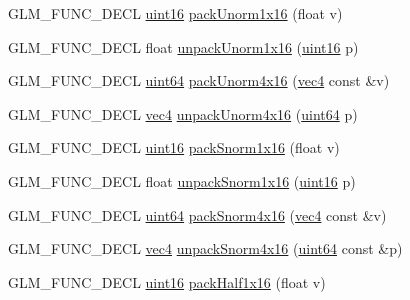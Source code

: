 \begin{DoxyCompactItemize}
\item 
G\+L\+M\+\_\+\+F\+U\+N\+C\+\_\+\+D\+E\+CL \hyperlink{group__gtc__type__precision_gad8c2939e1fdd8e5828b31d95c52255d5}{uint16} \hyperlink{group__gtc__packing_ga60c7d915f5653559ae02c2f79a8c5c1d}{pack\+Unorm1x16} (float v)
\item 
G\+L\+M\+\_\+\+F\+U\+N\+C\+\_\+\+D\+E\+CL float \hyperlink{group__gtc__packing_ga7770e3ade4f4764cc1b2eb42ac4ec188}{unpack\+Unorm1x16} (\hyperlink{group__gtc__type__precision_gad8c2939e1fdd8e5828b31d95c52255d5}{uint16} p)
\item 
G\+L\+M\+\_\+\+F\+U\+N\+C\+\_\+\+D\+E\+CL \hyperlink{group__gtc__type__precision_gae3632bf9b37da66233d78930dd06378a}{uint64} \hyperlink{group__gtc__packing_gac561f06c908b7302537a8ef29fcb409e}{pack\+Unorm4x16} (\hyperlink{group__core__types_ga5881b1b022d7fd1b7218f5916532dd02}{vec4} const \&v)
\item 
G\+L\+M\+\_\+\+F\+U\+N\+C\+\_\+\+D\+E\+CL \hyperlink{group__core__types_ga5881b1b022d7fd1b7218f5916532dd02}{vec4} \hyperlink{group__gtc__packing_gafb2b502bc406031a5618ce930139a9e3}{unpack\+Unorm4x16} (\hyperlink{group__gtc__type__precision_gae3632bf9b37da66233d78930dd06378a}{uint64} p)
\item 
G\+L\+M\+\_\+\+F\+U\+N\+C\+\_\+\+D\+E\+CL \hyperlink{group__gtc__type__precision_gad8c2939e1fdd8e5828b31d95c52255d5}{uint16} \hyperlink{group__gtc__packing_gac29411d6c0f6ed0fe9f0396dfe92e0e8}{pack\+Snorm1x16} (float v)
\item 
G\+L\+M\+\_\+\+F\+U\+N\+C\+\_\+\+D\+E\+CL float \hyperlink{group__gtc__packing_ga246f451cebf590726324f7a283e3d65e}{unpack\+Snorm1x16} (\hyperlink{group__gtc__type__precision_gad8c2939e1fdd8e5828b31d95c52255d5}{uint16} p)
\item 
G\+L\+M\+\_\+\+F\+U\+N\+C\+\_\+\+D\+E\+CL \hyperlink{group__gtc__type__precision_gae3632bf9b37da66233d78930dd06378a}{uint64} \hyperlink{group__gtc__packing_ga9b237d7c66b7a71964e6d1f4dc06539f}{pack\+Snorm4x16} (\hyperlink{group__core__types_ga5881b1b022d7fd1b7218f5916532dd02}{vec4} const \&v)
\item 
G\+L\+M\+\_\+\+F\+U\+N\+C\+\_\+\+D\+E\+CL \hyperlink{group__core__types_ga5881b1b022d7fd1b7218f5916532dd02}{vec4} \hyperlink{group__gtc__packing_gadb01fc0530f07beb509c89d97b6f4d20}{unpack\+Snorm4x16} (\hyperlink{group__gtc__type__precision_gae3632bf9b37da66233d78930dd06378a}{uint64} const \&p)
\item 
G\+L\+M\+\_\+\+F\+U\+N\+C\+\_\+\+D\+E\+CL \hyperlink{group__gtc__type__precision_gad8c2939e1fdd8e5828b31d95c52255d5}{uint16} \hyperlink{group__gtc__packing_gaba534b320836a35372e00af5771dd1a2}{pack\+Half1x16} (float v)

\end{DoxyCompactItemize}

